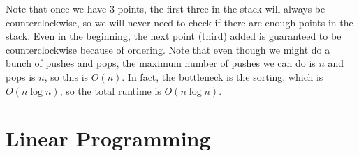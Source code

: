 \documentclass{article}
\begin{document}
\begin{example}
\begin{algorithm}[H]
\begin{algorithmic}
            \EndWhile
          \EndFor 
          \State {} 
        \EndFunction
      \end{algorithmic}
    \end{algorithm}
    Note that once we have 3 points, the first three in the stack will always be counterclockwise, so we will never need to check if there are enough points in the stack. Even in the beginning, the next point (third) added is guaranteed to be counterclockwise because of ordering. Note that even though we might do a bunch of pushes and pops, the maximum number of pushes we can do is $n$ and pops is $n$, so this is $O(n)$. In fact, the bottleneck is the sorting, which is $O(n \log{n})$, so the total runtime is $O(n \log{n})$. 
  \end{example}

\section{Linear Programming}
\end{document}
